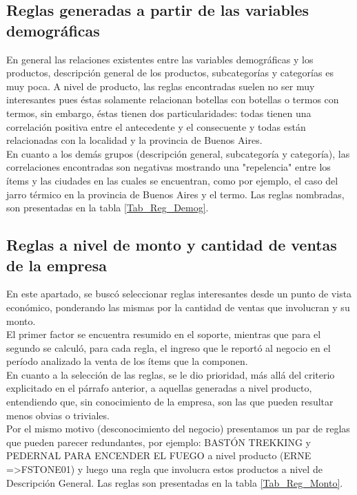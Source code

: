 \documentclass[]{article}
\begin{document}
	\subsection{Reglas generadas a partir de las variables demográficas}
	En general las relaciones existentes entre las variables demográficas y los productos, descripción general de los productos, subcategorías y categorías es muy poca. A nivel de producto, las reglas encontradas suelen no ser muy interesantes pues éstas solamente relacionan botellas con botellas o termos con termos, sin embargo, éstas tienen dos particularidades: todas tienen una correlación positiva entre el antecedente y el consecuente y todas están relacionadas con la localidad y la provincia de Buenos Aires.\\
	
	En cuanto a los demás grupos (descripción general, subcategoría y categoría), las correlaciones encontradas son negativas mostrando una "repelencia" entre los ítems y las ciudades en las cuales se encuentran, como por ejemplo, el caso del jarro térmico en la provincia de Buenos Aires y el termo. Las reglas nombradas, son presentadas en la tabla  \ref{Tab_Reg_Demog}.
	
	\subsection{Reglas a nivel de monto y cantidad de ventas de la empresa}
	
	En este apartado, se buscó seleccionar reglas interesantes desde un punto de vista económico, ponderando las mismas por la cantidad de ventas que involucran y su monto.\\
	
	El primer factor se encuentra resumido en el soporte, mientras que para el segundo se calculó, para cada regla, el ingreso que le reportó al negocio en el período analizado la venta de los ítems que la componen.\\
	
	En cuanto a la selección de las reglas, se le dio prioridad, más allá del criterio explicitado en el párrafo anterior, a aquellas generadas a nivel producto, entendiendo que, sin conocimiento de la empresa, son las que pueden resultar menos obvias o triviales.\\
	
	Por el mismo motivo (desconocimiento del negocio) presentamos un par de reglas que pueden parecer redundantes, por ejemplo: BASTÓN TREKKING y PEDERNAL PARA ENCENDER EL FUEGO a nivel producto ({ERNE} =\textgreater {FSTONE01}) y luego una regla que involucra estos productos a nivel de Descripción General. Las reglas son presentadas en la tabla \ref{Tab_Reg_Monto}.
	
\end{document}
